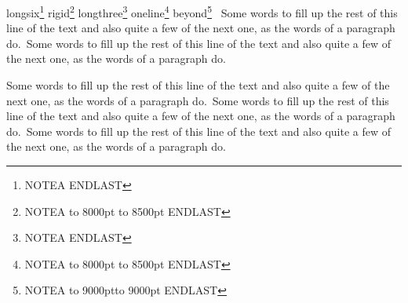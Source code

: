 \documentclass[a4paper]{memoir}
\newif\iftestbib
\newcommand\filler{Some words to fill up the rest of this line of the text and
  also quite a few of the next one, as the words of a paragraph do.}
\def\testlongsix{longsix}\def\testrigid{rigid}\def\testlongthree{longthree}
\def\testoneline{oneline}\def\testbeyond{beyond}
\begin{document}
  \ifx\testcase\testlongsix\footnote{NOTEA \lipsum[1]\lipsum[1]\lipsum[1]\lipsum[1]%
    \lipsum[1]\lipsum[1] ENDLAST}\fi
  \ifx\testcase\testrigid\footnote{NOTEA \hbox to 8000pt{}
    \hbox to 8500pt{} ENDLAST}\fi
  \ifx\testcase\testlongthree\footnote{NOTEA \lipsum[1]\lipsum[1]\lipsum[1] ENDLAST}\fi
  \ifx\testcase\testoneline\footnote{NOTEA \hbox to 8000pt{}\nobreak{}
    \hbox to 8500pt{} ENDLAST}\fi
  \ifx\testcase\testbeyond\footnote{NOTEA \hbox to 9000pt{}\hbox to 9000pt{} ENDLAST}\fi
  \ \filler\ \filler\par
  \filler\ \filler\ \filler\par
\iftestbib\printbibliography\fi
\end{document}

